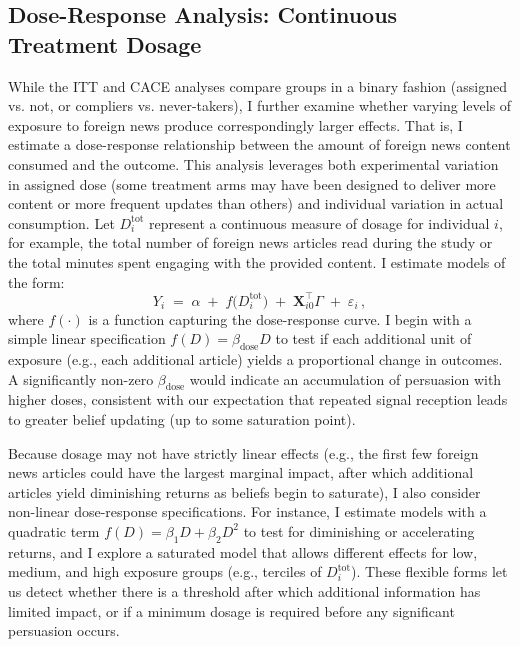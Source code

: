 \documentclass[12pt, american]{article}
\begin{document}
\subsection{Dose-Response Analysis: Continuous Treatment Dosage}
While the ITT and CACE analyses compare groups in a binary fashion (assigned vs. not, or compliers vs. never-takers), I further examine whether varying levels of exposure to foreign news produce correspondingly larger effects. That is, I estimate a dose-response relationship between the amount of foreign news content consumed and the outcome. This analysis leverages both experimental variation in assigned dose (some treatment arms may have been designed to deliver more content or more frequent updates than others) and individual variation in actual consumption. Let $D_{i}^{\text{tot}}$ represent a continuous measure of dosage for individual $i$, for example, the total number of foreign news articles read during the study or the total minutes spent engaging with the provided content. I estimate models of the form: 
\begin{equation}\label{eq:dose}
Y_{i} \;=\; \alpha \;+\; f\!\big(D_{i}^{\text{tot}}\big) \;+\; \mathbf{X}_{i0}^{\top}\Gamma \;+\; \varepsilon_{i}\,,
\end{equation}
where $f(\cdot)$ is a function capturing the dose-response curve. I begin with a simple linear specification $f(D) = \beta_{\text{dose}} D$ to test if each additional unit of exposure (e.g., each additional article) yields a proportional change in outcomes. A significantly non-zero $\beta_{\text{dose}}$ would indicate an accumulation of persuasion with higher doses, consistent with our expectation that repeated signal reception leads to greater belief updating (up to some saturation point). 

Because dosage may not have strictly linear effects (e.g., the first few foreign news articles could have the largest marginal impact, after which additional articles yield diminishing returns as beliefs begin to saturate), I also consider non-linear dose-response specifications. For instance, I estimate models with a quadratic term $f(D) = \beta_1 D + \beta_2 D^2$ to test for diminishing or accelerating returns, and I explore a saturated model that allows different effects for low, medium, and high exposure groups (e.g., terciles of $D_{i}^{\text{tot}}$). These flexible forms let us detect whether there is a threshold after which additional information has limited impact, or if a minimum dosage is required before any significant persuasion occurs.
\end{document}
